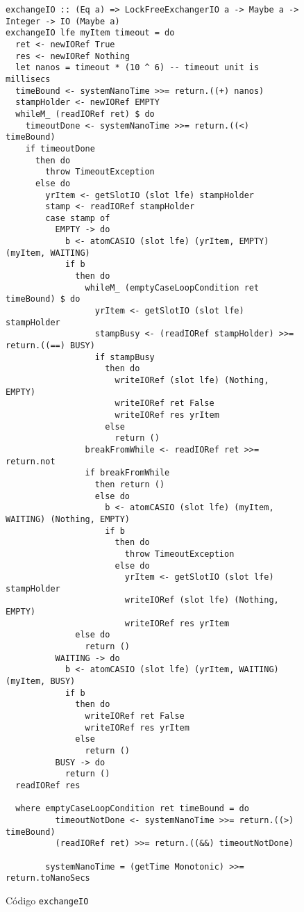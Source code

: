 \begin{figure}[t]
  \centering
  \begin{verbatim}
exchangeIO :: (Eq a) => LockFreeExchangerIO a -> Maybe a -> Integer -> IO (Maybe a)
exchangeIO lfe myItem timeout = do
  ret <- newIORef True
  res <- newIORef Nothing
  let nanos = timeout * (10 ^ 6) -- timeout unit is millisecs
  timeBound <- systemNanoTime >>= return.((+) nanos)
  stampHolder <- newIORef EMPTY
  whileM_ (readIORef ret) $ do
    timeoutDone <- systemNanoTime >>= return.((<) timeBound)
    if timeoutDone
      then do
        throw TimeoutException
      else do
        yrItem <- getSlotIO (slot lfe) stampHolder
        stamp <- readIORef stampHolder
        case stamp of
          EMPTY -> do
            b <- atomCASIO (slot lfe) (yrItem, EMPTY) (myItem, WAITING)
            if b
              then do
                whileM_ (emptyCaseLoopCondition ret timeBound) $ do
                  yrItem <- getSlotIO (slot lfe) stampHolder
                  stampBusy <- (readIORef stampHolder) >>= return.((==) BUSY)
                  if stampBusy
                    then do
                      writeIORef (slot lfe) (Nothing, EMPTY)
                      writeIORef ret False
                      writeIORef res yrItem
                    else
                      return ()
                breakFromWhile <- readIORef ret >>= return.not
                if breakFromWhile
                  then return ()
                  else do
                    b <- atomCASIO (slot lfe) (myItem, WAITING) (Nothing, EMPTY)
                    if b
                      then do
                        throw TimeoutException
                      else do
                        yrItem <- getSlotIO (slot lfe) stampHolder
                        writeIORef (slot lfe) (Nothing, EMPTY)
                        writeIORef res yrItem
              else do
                return ()
          WAITING -> do
            b <- atomCASIO (slot lfe) (yrItem, WAITING) (myItem, BUSY)
            if b
              then do
                writeIORef ret False
                writeIORef res yrItem
              else
                return ()
          BUSY -> do
            return ()
  readIORef res

  where emptyCaseLoopCondition ret timeBound = do
          timeoutNotDone <- systemNanoTime >>= return.((>) timeBound)
          (readIORef ret) >>= return.((&&) timeoutNotDone)

        systemNanoTime = (getTime Monotonic) >>= return.toNanoSecs
  \end{verbatim}
  \caption{Código \texttt{exchangeIO}}
  \label{fig:exchange-io}
\end{figure}

